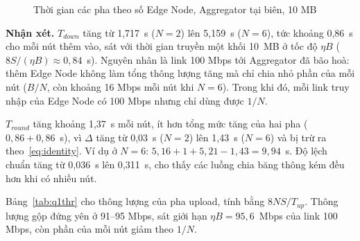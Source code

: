 \begin{figure}[H]
    \centering
    \caption{Thời gian các pha theo số Edge Node, Aggregator tại biên, 10 MB}
    \label{fig:q1}
\end{figure}

\textbf{Nhận xét.} $T_{down}$ tăng từ 1{,}717~s ($N = 2$) lên 5{,}159~s ($N = 6$), tức khoảng 0{,}86~s cho mỗi nút thêm vào, sát với thời gian truyền một khối 10~MB ở tốc độ $\eta B$ ($8S/(\eta B) \approx 0{,}84$~s). Nguyên nhân là link 100 Mbps tới Aggregator đã bão hoà: thêm Edge Node không làm tổng thông lượng tăng mà chỉ chia nhỏ phần của mỗi nút ($B/N$, còn khoảng 16 Mbps mỗi nút khi $N = 6$). Trong khi đó, mỗi link truy nhập của Edge Node có 100 Mbps nhưng chỉ dùng được $1/N$.

$T_{round}$ tăng khoảng 1{,}37~s mỗi nút, ít hơn tổng mức tăng của hai pha ($0{,}86 + 0{,}86$~s), vì $\Delta$ tăng từ 0{,}03~s ($N = 2$) lên 1{,}43~s ($N = 6$) và bị trừ ra theo~\eqref{eq:identity}. Ví dụ ở $N = 6$: $5{,}16 + 1 + 5{,}21 - 1{,}43 = 9{,}94$~s. Độ lệch chuẩn tăng từ 0{,}036~s lên 0{,}311~s, cho thấy các luồng chia băng thông kém đều hơn khi có nhiều nút.

Bảng~\ref{tab:q1thr} cho thông lượng của pha upload, tính bằng $8NS/T_{up}$. Thông lượng gộp đứng yên ở 91--95 Mbps, sát giới hạn $\eta B = 95{,}6$~Mbps của link 100 Mbps, còn phần của mỗi nút giảm theo $1/N$.

